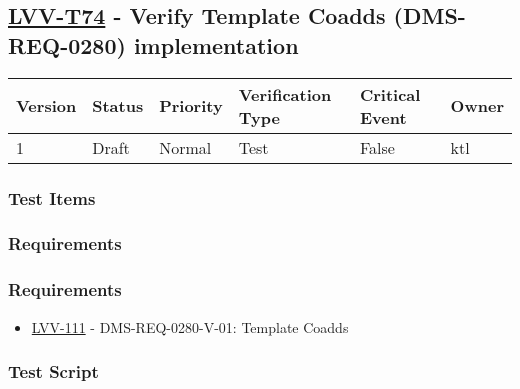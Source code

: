 \hypertarget{lvv-t74---verify-template-coadds-dms-req-0280-implementation}{%
\subsection{\texorpdfstring{\href{https://jira.lsstcorp.org/secure/Tests.jspa\#/testCase/LVV-T74}{LVV-T74}
- Verify Template Coadds (DMS-REQ-0280)
implementation}{LVV-T74 - Verify Template Coadds (DMS-REQ-0280) implementation}}\label{lvv-t74---verify-template-coadds-dms-req-0280-implementation}}

\begin{longtable}[]{@{}llllll@{}}
\toprule
Version & Status & Priority & Verification Type & Critical Event &
Owner\tabularnewline
\midrule
\endhead
1 & Draft & Normal & Test & False & ktl\tabularnewline
\bottomrule
\end{longtable}

\hypertarget{test-items-31}{%
\subsubsection{Test Items}\label{test-items-31}}

\hypertarget{requirements-62}{%
\subsubsection{Requirements}\label{requirements-62}}

\hypertarget{requirements-63}{%
\subsubsection{Requirements}\label{requirements-63}}

\begin{itemize}
\tightlist
\item
  \href{https://jira.lsstcorp.org/browse/LVV-111}{LVV-111} -
  DMS-REQ-0280-V-01: Template Coadds
\end{itemize}

\hypertarget{test-script-31}{%
\subsubsection{Test Script}\label{test-script-31}}


